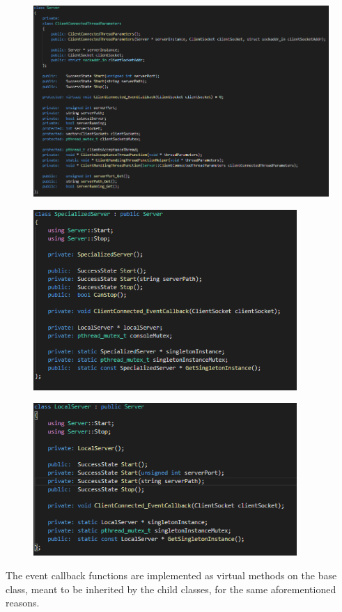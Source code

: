 \documentclass[runningheads]{llncs}
\begin{document}
\begin{figure}[H]
\centering
\includegraphics[width=150mm]{Server.png}
\end{figure}
\begin{figure}[H]
\centering
\includegraphics[width=100mm]{SpecializedServer.png}
\end{figure}
\begin{figure}[H]
\centering
\includegraphics[width=100mm]{LocalServer.png}
\end{figure}

The event callback functions are implemented as virtual methods on the base class, meant to be inherited by the child classes, for the same aforementioned reasons.\\
\end{document}
